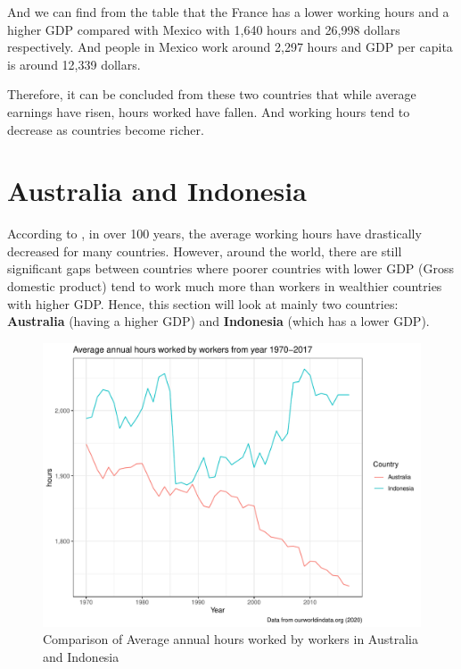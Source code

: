 \documentclass[11pt,a4paper,]{article}
\begin{document}
And we can find from the table that the France has a lower working hours and a higher GDP compared with Mexico with 1,640 hours and 26,998 dollars respectively. And people in Mexico work around 2,297 hours and GDP per capita is around 12,339 dollars.

Therefore, it can be concluded from these two countries that while average earnings have risen, hours worked have fallen. And working hours tend to decrease as countries become richer.

\clearpage

\hypertarget{australia-and-indonesia}{%
\section{Australia and Indonesia}\label{australia-and-indonesia}}

According to \textcite{owidworkinghours}, in over 100 years, the average working hours have drastically decreased for many countries. However, around the world, there are still significant gaps between countries where poorer countries with lower GDP (Gross domestic product) tend to work much more than workers in wealthier countries with higher GDP. Hence, this section will look at mainly two countries: \textbf{Australia} (having a higher GDP) and \textbf{Indonesia} (which has a lower GDP).

\begin{figure}
\centering
\includegraphics{report_files/figure-latex/awh-1.pdf}
\caption{\label{fig:awh}Comparison of Average annual hours worked by workers in Australia and Indonesia}
\end{figure}
\end{document}
